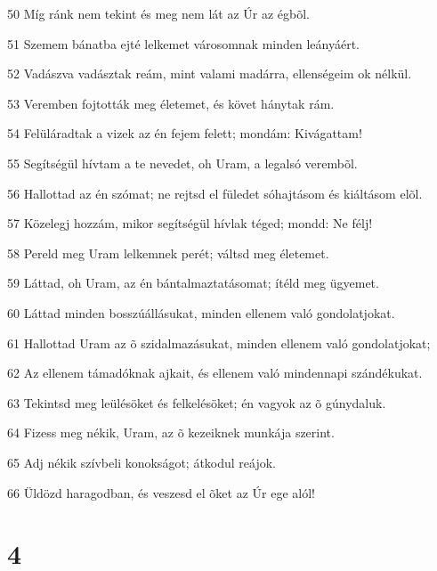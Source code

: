 \par 50 Míg ránk nem tekint és meg nem lát az Úr az égbõl.
\par 51 Szemem bánatba ejté lelkemet városomnak minden leányáért.
\par 52 Vadászva vadásztak reám, mint valami madárra, ellenségeim ok nélkül.
\par 53 Veremben fojtották meg életemet, és követ hánytak rám.
\par 54 Felüláradtak a vizek az én fejem felett; mondám: Kivágattam!
\par 55 Segítségül hívtam a te nevedet, oh Uram, a legalsó verembõl.
\par 56 Hallottad az én szómat; ne rejtsd el füledet sóhajtásom és kiáltásom elõl.
\par 57 Közelegj hozzám, mikor segítségül hívlak téged; mondd: Ne félj!
\par 58 Pereld meg Uram lelkemnek perét; váltsd meg életemet.
\par 59 Láttad, oh Uram, az én bántalmaztatásomat; ítéld meg ügyemet.
\par 60 Láttad minden bosszúállásukat, minden ellenem való gondolatjokat.
\par 61 Hallottad Uram az õ szidalmazásukat, minden ellenem való gondolatjokat;
\par 62 Az ellenem támadóknak ajkait, és ellenem való mindennapi szándékukat.
\par 63 Tekintsd meg leülésöket és felkelésöket; én vagyok az õ gúnydaluk.
\par 64 Fizess meg nékik, Uram, az õ kezeiknek munkája szerint.
\par 65 Adj nékik szívbeli konokságot; átkodul reájok.
\par 66 Üldözd haragodban, és veszesd el õket az Úr ege alól!

\chapter{4}

